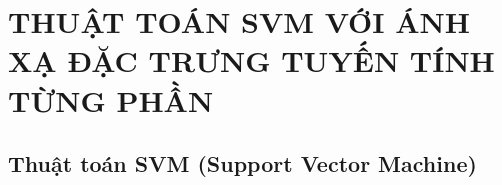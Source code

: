 \sloppy 
\chapter{THUẬT TOÁN SVM VỚI ÁNH XẠ ĐẶC TRƯNG TUYẾN TÍNH TỪNG PHẦN}
\section{Thuật toán SVM (Support Vector Machine)}



